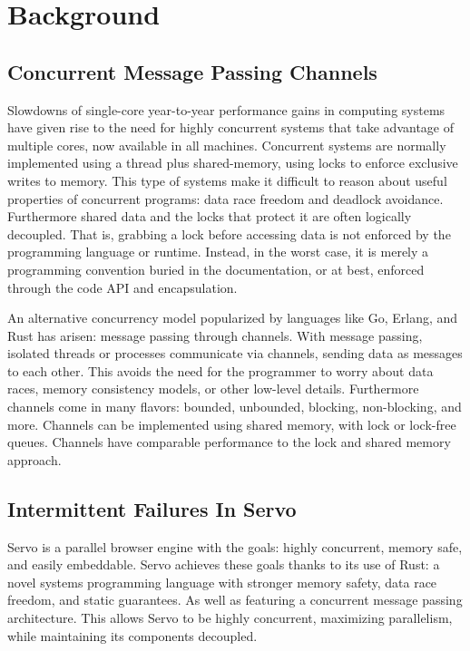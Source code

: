 \section{Background}

\subsection{Concurrent Message Passing Channels}
Slowdowns of single-core year-to-year performance gains in computing systems have given rise to the need
for highly concurrent systems that take advantage of multiple cores, now available
in all machines.
Concurrent systems are normally implemented using a thread plus shared-memory,
using locks to enforce exclusive writes to memory. This type of systems make
it difficult to reason about useful properties of concurrent programs:
data race freedom and deadlock avoidance.
Furthermore shared data and the locks that protect it are often logically decoupled. That is,
grabbing a lock before accessing data is not enforced by the programming language or runtime.
Instead, in the worst case, it is merely a programming convention buried in the documentation,
or at best, enforced through the code API and encapsulation.

An alternative concurrency model popularized by languages like Go, Erlang, and Rust has
arisen: message passing through channels. With message passing, isolated
threads or processes communicate via channels, sending data as messages to each other.
This avoids the need for the programmer to worry about data races, memory consistency
models, or other low-level details. Furthermore channels come in many flavors:
bounded, unbounded, blocking, non-blocking, and more. Channels can be implemented using
shared memory, with lock or lock-free queues. Channels have comparable performance to the
lock and shared memory approach.

\subsection{Intermittent Failures In Servo}
Servo \cite{servo} is a parallel browser engine with the goals: highly concurrent,
memory safe, and easily embeddable. Servo achieves these goals thanks to
its use of Rust: a novel systems programming language with stronger memory safety,
data race freedom, and static guarantees. As well as featuring a concurrent message passing
architecture. This allows Servo to be highly concurrent, maximizing parallelism,
while maintaining its components decoupled.

